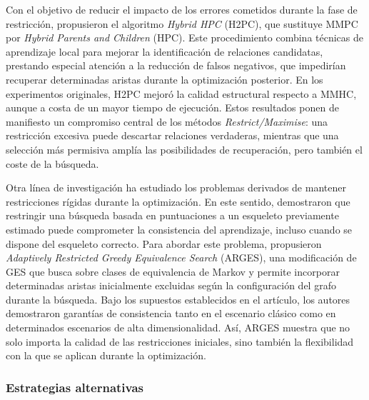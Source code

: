 Con el objetivo de reducir el impacto de los errores cometidos durante la fase de restricción, \citet{Gasse2014H2PC} propusieron el algoritmo \textit{Hybrid HPC} (H2PC), que sustituye MMPC por \textit{Hybrid Parents and Children} (HPC). Este procedimiento combina técnicas de aprendizaje local para mejorar la identificación de relaciones candidatas, prestando especial atención a la reducción de falsos negativos, que impedirían recuperar determinadas aristas durante la optimización posterior. En los experimentos originales, H2PC mejoró la calidad estructural respecto a MMHC, aunque a costa de un mayor tiempo de ejecución. Estos resultados ponen de manifiesto un compromiso central de los métodos \textit{Restrict/Maximise}: una restricción excesiva puede descartar relaciones verdaderas, mientras que una selección más permisiva amplía las posibilidades de recuperación, pero también el coste de la búsqueda.

Otra línea de investigación ha estudiado los problemas derivados de mantener restricciones rígidas durante la optimización. En este sentido, \citet{Nandy2018ARGES} demostraron que restringir una búsqueda basada en puntuaciones a un esqueleto previamente estimado puede comprometer la consistencia del aprendizaje, incluso cuando se dispone del esqueleto correcto. Para abordar este problema, propusieron \textit{Adaptively Restricted Greedy Equivalence Search} (ARGES), una modificación de GES \citep{Chickering2002GES} que busca sobre clases de equivalencia de Markov y permite incorporar determinadas aristas inicialmente excluidas según la configuración del grafo durante la búsqueda. Bajo los supuestos establecidos en el artículo, los autores demostraron garantías de consistencia tanto en el escenario clásico como en determinados escenarios de alta dimensionalidad. Así, ARGES muestra que no solo importa la calidad de las restricciones iniciales, sino también la flexibilidad con la que se aplican durante la optimización.

\subsubsection{Estrategias alternativas}

